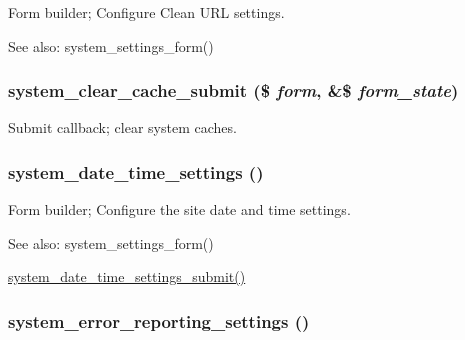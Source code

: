 Form builder; Configure Clean URL settings.

\begin{Desc}
\item[See also:]system\_\-settings\_\-form() \end{Desc}
\hypertarget{group__forms_g07cc959f377e07b079d9875fc5c4b1b7}{
\subsubsection[{system\_\-clear\_\-cache\_\-submit}]{\setlength{\rightskip}{0pt plus 5cm}system\_\-clear\_\-cache\_\-submit (\$ {\em form}, \/  \&\$ {\em form\_\-state})}}
\label{group__forms_g07cc959f377e07b079d9875fc5c4b1b7}


Submit callback; clear system caches. \hypertarget{group__forms_g2c5e3711c4a19fa4759efcee41487070}{
\subsubsection[{system\_\-date\_\-time\_\-settings}]{\setlength{\rightskip}{0pt plus 5cm}system\_\-date\_\-time\_\-settings ()}}
\label{group__forms_g2c5e3711c4a19fa4759efcee41487070}


Form builder; Configure the site date and time settings.

\begin{Desc}
\item[See also:]system\_\-settings\_\-form() 

\hyperlink{system_8admin_8inc_ee460f082ac9517109ebaef862b5b8d7}{system\_\-date\_\-time\_\-settings\_\-submit()} \end{Desc}
\hypertarget{group__forms_gc3d206af540977bb598cae42759491bc}{
\subsubsection[{system\_\-error\_\-reporting\_\-settings}]{\setlength{\rightskip}{0pt plus 5cm}system\_\-error\_\-reporting\_\-settings ()}}
\label{group__forms_gc3d206af540977bb598cae42759491bc}


